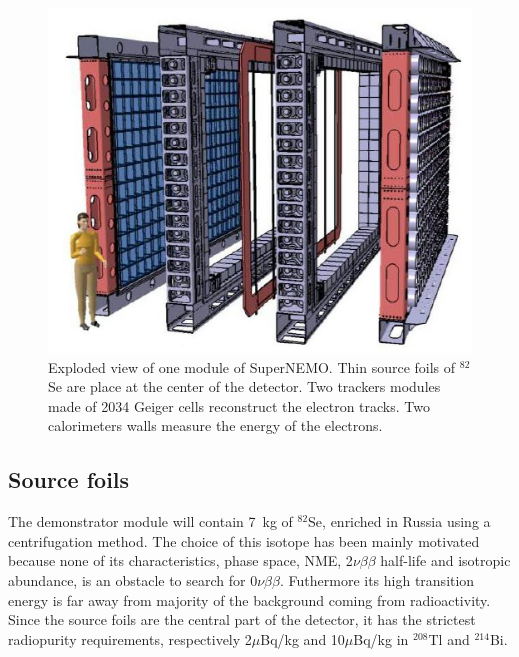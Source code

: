 \documentclass[main.tex]{subfiles}
\begin{document}
\begin{figure}[h!]
\begin{center}
\includegraphics[scale=0.65]{pictures/Chap3/snemomodule.png}
\caption{Exploded view of one module of SuperNEMO. Thin source foils of $^{\text{82}}$Se are place at the center of the detector. Two trackers modules made of 2034 Geiger cells reconstruct the electron tracks. Two calorimeters walls measure the energy of the electrons.}
\label{SuperNEMOexplodedView}
\end{center}
\end{figure}


\FloatBarrier


\subsection{Source foils}


\NI The demonstrator module will contain 7~kg of $^{\text{82}}$Se, enriched in Russia using a centrifugation method. The choice of this isotope has been mainly motivated because none of its characteristics, phase space, NME, 2$\nu\beta\beta$ half-life and isotropic abundance, is an obstacle to search for 0$\nu\beta\beta$. Futhermore its high transition energy is far away from majority of the background coming from radioactivity.
Since the source foils are the central part of the detector, it has the strictest radiopurity requirements, respectively 2$\mu$Bq/kg and 10$\mu$Bq/kg in $^{\text{208}}$Tl and $^{\text{214}}$Bi.

\bigskip
\end{document}

